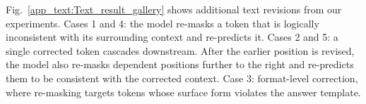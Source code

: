 \documentclass{llmxive}
\begin{document}
Fig.~\ref{app_text:Text_result_gallery} shows additional text revisions from our experiments. Cases 1 and 4: the model re-masks a token that is logically inconsistent with its surrounding context and re-predicts it. Cases 2 and 5: a single corrected token cascades downstream. After the earlier position is revised, the model also re-masks dependent positions further to the right and re-predicts them to be consistent with the corrected context. Case 3: format-level correction, where re-masking targets tokens whose surface form violates the answer template.
\end{document}
